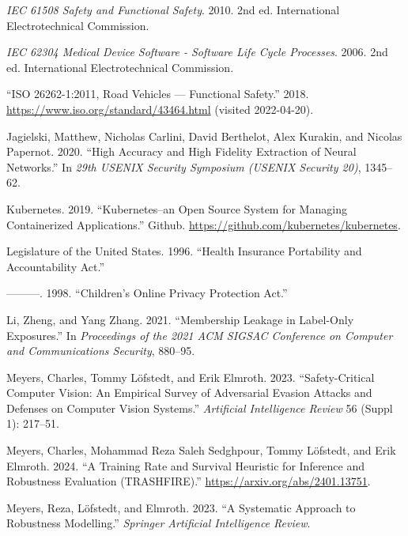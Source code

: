 \documentclass[
]{article}
\newlength{\cslhangindent}
\newlength{\cslentryspacingunit} %
\newenvironment{CSLReferences}[2] %
 {%
  \setlength{\parindent}{0pt}
  \ifodd #1
  \let\oldpar\par
  \def\par{\hangindent=\cslhangindent\oldpar}
  \fi
  \setlength{\parskip}{#2\cslentryspacingunit}
 }%
 {}
\begin{document}
\begin{CSLReferences}{1}{0}
\leavevmode{}%
\emph{IEC 61508 Safety and Functional Safety}. 2010. 2nd ed.
International Electrotechnical Commission.

\leavevmode{}%
\emph{IEC 62304 Medical Device Software - Software Life Cycle
Processes}. 2006. 2nd ed. International Electrotechnical Commission.

\leavevmode{}%
{``{ISO} 26262-1:2011, Road Vehicles --- Functional Safety.''} 2018.
\url{https://www.iso.org/standard/43464.html} (visited 2022-04-20).

\leavevmode{}%
Jagielski, Matthew, Nicholas Carlini, David Berthelot, Alex Kurakin, and
Nicolas Papernot. 2020. {``High Accuracy and High Fidelity Extraction of
Neural Networks.''} In \emph{29th USENIX Security Symposium (USENIX
Security 20)}, 1345--62.

\leavevmode{}%
Kubernetes. 2019. {``Kubernetes--an Open Source System for Managing
Containerized Applications.''} Github.
\url{https://github.com/kubernetes/kubernetes}.

\leavevmode{}%
Legislature of the United States. 1996. {``Health Insurance Portability
and Accountability Act.''}

\leavevmode{}%
---------. 1998. {``Children's Online Privacy Protection Act.''}

\leavevmode{}%
Li, Zheng, and Yang Zhang. 2021. {``Membership Leakage in Label-Only
Exposures.''} In \emph{Proceedings of the 2021 ACM SIGSAC Conference on
Computer and Communications Security}, 880--95.

\leavevmode{}%
Meyers, Charles, Tommy Löfstedt, and Erik Elmroth. 2023.
{``Safety-Critical Computer Vision: An Empirical Survey of Adversarial
Evasion Attacks and Defenses on Computer Vision Systems.''}
\emph{Artificial Intelligence Review} 56 (Suppl 1): 217--51.

\leavevmode{}%
Meyers, Charles, Mohammad Reza Saleh Sedghpour, Tommy Löfstedt, and Erik
Elmroth. 2024. {``A Training Rate and Survival Heuristic for Inference
and Robustness Evaluation (TRASHFIRE).''}
\url{https://arxiv.org/abs/2401.13751}.

\leavevmode{}%
Meyers, Reza, Löfstedt, and Elmroth. 2023. {``A Systematic Approach to
Robustness Modelling.''} \emph{Springer Artificial Intelligence Review}.


\end{CSLReferences}
\end{document}
